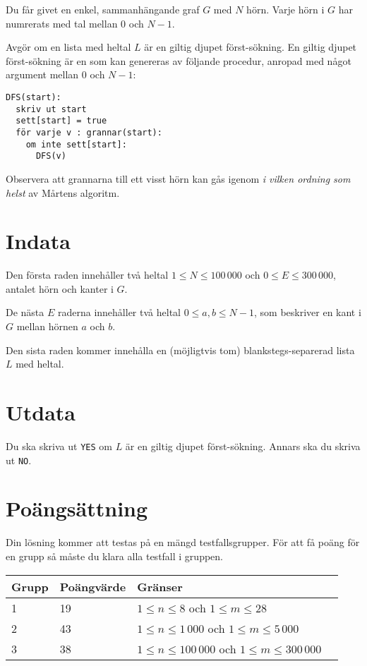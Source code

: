 Du får givet en enkel, sammanhängande graf $G$ med $N$ hörn. Varje hörn i $G$ har numrerats med tal mellan $0$ och $N-1$.

Avgör om en lista med heltal $L$ är en giltig djupet först-sökning. En giltig djupet först-sökning är en som kan genereras av följande procedur, anropad med något argument mellan $0$ och $N - 1$:

\begin{verbatim}
DFS(start):
  skriv ut start
  sett[start] = true
  för varje v : grannar(start):
    om inte sett[start]:
      DFS(v)
\end{verbatim}

Observera att grannarna till ett visst hörn kan gås igenom \emph{i vilken ordning som helst} av Mårtens algoritm.

\section*{Indata}
Den första raden innehåller två heltal $1 \le N \le 100\,000$ och $0 \le E \le 300\,000$, antalet hörn och kanter i $G$.

De nästa $E$ raderna innehåller två heltal $0 \le a, b \le N - 1$, som beskriver en kant i $G$ mellan hörnen $a$ och $b$.

Den sista raden kommer innehålla en (möjligtvis tom) blankstegs-separerad lista $L$ med heltal.

\section*{Utdata}
Du ska skriva ut \texttt{YES} om $L$ är en giltig djupet först-sökning. Annars ska du skriva ut \texttt{NO}.

\section*{Poängsättning}
Din lösning kommer att testas på en mängd testfallsgrupper. För att få poäng
för en grupp så måste du klara alla testfall i gruppen.

\begin{tabular}{| l | l | l | l |}
    \hline
    Grupp & Poängvärde & Gränser    \\ \hline
    1     & 19         & $1 \le n \le 8$ och $1 \le m \le 28$ \\ \hline
    2     & 43         & $1 \le n \le 1\,000$ och $1 \le m \le 5\,000$ \\ \hline
    3     & 38         & $1 \le n \le 100\,000$ och $1 \le m \le 300\,000$ \\ \hline
\end{tabular}


